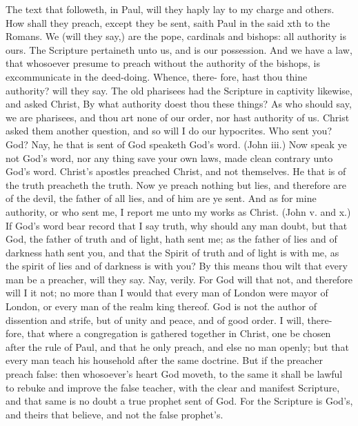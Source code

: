\documentclass{custom}
\begin{document}
The text that followeth, in Paul, will they haply lay 
to my charge and others. How shall they preach, except 
they be sent, saith Paul in the said xth to the Romans. We 
(will they say,) are the pope, cardinals and bishops: all 
authority is ours. The Scripture pertaineth unto us, and 
is our possession. And we have a law, that whosoever 
presume to preach without the authority of the bishops, 
is excommunicate in the deed-doing. Whence, there- 
fore, hast thou thine authority? will they say. The old 
pharisees had the Scripture in captivity likewise, and 
asked Christ, By what authority doest thou these things? 
As who should say, we are pharisees, and thou art none of our 
order, nor hast authority of us. Christ asked them another 
question, and so will I do our hypocrites. Who sent you? 
God? Nay, he that is sent of God speaketh God's 
word. (John iii.) Now speak ye not God's word, nor 
any thing save your own laws, made clean contrary unto 
God's word. Christ's apostles preached Christ, and not 
themselves. He that is of the truth preacheth the truth. 
Now ye preach nothing but lies, and therefore are of 
the devil, the father of all lies, and of him are ye sent. 
And as for mine authority, or who sent me, I report me 
unto my works as Christ. (John v. and x.) If God's 
word bear record that I say truth, why should any man 
doubt, but that God, the father of truth and of light, hath 
sent me; as the father of lies and of darkness hath sent 
you, and that the Spirit of truth and of light is with me, 
as the spirit of lies and of darkness is with you? By this 
means thou wilt that every man be a preacher, will they say. 
Nay, verily. For God will that not, and therefore will 
I it not; no more than I would that every man of London 
were mayor of London, or every man of the realm king 
thereof. God is not the author of dissention and strife, 
but of unity and peace, and of good order. I will, there- 
fore, that where a congregation is gathered together in 
Christ, one be chosen after the rule of Paul, and that he 
only preach, and else no man openly; but that every man 
teach his household after the same doctrine. But if the 
preacher preach false: then whosoever's heart God moveth, 
to the same it shall be lawful to rebuke and improve the 
false teacher, with the clear and manifest Scripture, and 
that same is no doubt a true prophet sent of God. For 
the Scripture is God's, and theirs that believe, and not 
the false prophet's. 
\end{document}
